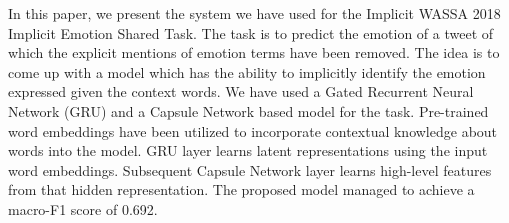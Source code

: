 In this paper, we present the system we have used for the Implicit WASSA 2018 Implicit Emotion Shared Task. The task is to predict the emotion of a tweet of which the explicit mentions of emotion terms have been removed. The idea is to come up with a model which has the ability to implicitly identify the emotion expressed given the context words. We have used a Gated Recurrent Neural Network (GRU) and a Capsule Network based model for the task. Pre-trained word embeddings have been utilized to incorporate contextual knowledge about words into the model. GRU layer learns latent representations using the input word embeddings. Subsequent  Capsule Network layer learns high-level features from that hidden representation. The proposed model managed to achieve a macro-F1 score of 0.692.
